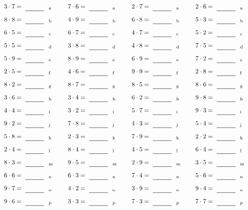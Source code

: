 \documentclass
[
  draft    = true,
  fontsize = 11pt,
  parskip  = half-
]
{scrartcl}
\begin{document}
\par\vfill\par
\begin{align*}
    \pline{3\cdot7}&=\rline{a}
  & \pline{7\cdot6}&=\rline{a}
  & \pline{2\cdot7}&=\rline{a}
  & \pline{2\cdot6}&=\rline{a} \\[1ex]
    \pline{8\cdot8}&=\rline{b}
  & \pline{4\cdot9}&=\rline{b}
  & \pline{6\cdot8}&=\rline{b}
  & \pline{5\cdot3}&=\rline{b} \\[1ex]
    \pline{6\cdot5}&=\rline{c}
  & \pline{6\cdot7}&=\rline{c}
  & \pline{4\cdot7}&=\rline{c}
  & \pline{5\cdot2}&=\rline{c} \\[1ex]
    \pline{5\cdot5}&=\rline{d}
  & \pline{3\cdot8}&=\rline{d}
  & \pline{4\cdot8}&=\rline{d}
  & \pline{7\cdot5}&=\rline{d} \\[1ex]
    \pline{5\cdot9}&=\rline{e}
  & \pline{8\cdot9}&=\rline{e}
  & \pline{6\cdot9}&=\rline{e}
  & \pline{7\cdot2}&=\rline{e} \\[1ex]
    \pline{2\cdot5}&=\rline{f}
  & \pline{4\cdot6}&=\rline{f}
  & \pline{9\cdot9}&=\rline{f}
  & \pline{2\cdot8}&=\rline{f} \\[1ex]
    \pline{8\cdot2}&=\rline{g}
  & \pline{8\cdot7}&=\rline{g}
  & \pline{8\cdot5}&=\rline{g}
  & \pline{8\cdot6}&=\rline{g} \\[1ex]
    \pline{3\cdot6}&=\rline{h}
  & \pline{3\cdot4}&=\rline{h}
  & \pline{6\cdot2}&=\rline{h}
  & \pline{9\cdot8}&=\rline{h} \\[1ex]
    \pline{4\cdot4}&=\rline{i}
  & \pline{3\cdot2}&=\rline{i}
  & \pline{5\cdot7}&=\rline{i}
  & \pline{9\cdot3}&=\rline{i} \\[1ex]
    \pline{9\cdot2}&=\rline{j}
  & \pline{7\cdot8}&=\rline{j}
  & \pline{4\cdot3}&=\rline{j}
  & \pline{5\cdot4}&=\rline{j} \\[1ex]
    \pline{5\cdot8}&=\rline{k}
  & \pline{2\cdot3}&=\rline{k}
  & \pline{7\cdot9}&=\rline{k}
  & \pline{2\cdot2}&=\rline{k} \\[1ex]
    \pline{2\cdot4}&=\rline{l}
  & \pline{8\cdot4}&=\rline{l}
  & \pline{4\cdot5}&=\rline{l}
  & \pline{6\cdot4}&=\rline{l} \\[1ex]
    \pline{8\cdot3}&=\rline{m}
  & \pline{9\cdot5}&=\rline{m}
  & \pline{2\cdot9}&=\rline{m}
  & \pline{3\cdot5}&=\rline{m} \\[1ex]
    \pline{6\cdot6}&=\rline{n}
  & \pline{6\cdot3}&=\rline{n}
  & \pline{7\cdot4}&=\rline{n}
  & \pline{5\cdot6}&=\rline{n} \\[1ex]
    \pline{9\cdot7}&=\rline{o}
  & \pline{4\cdot2}&=\rline{o}
  & \pline{3\cdot9}&=\rline{o}
  & \pline{9\cdot4}&=\rline{o} \\[1ex]
    \pline{9\cdot6}&=\rline{p}
  & \pline{3\cdot3}&=\rline{p}
  & \pline{7\cdot3}&=\rline{p}
  & \pline{7\cdot7}&=\rline{p}
\end{align*}
\end{document}
